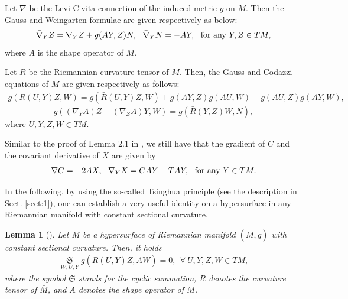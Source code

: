 \documentclass[reqno]{amsart}%
\newtheorem{lemma}[theorem]{Lemma}
\theoremstyle{definition}
\numberwithin{equation}{section}
\begin{document}
Let $\nabla$ be the Levi-Civita connection of the induced metric
$g$ on $M$. Then the Gauss and Weingarten
formulae are given respectively as below:
%
\begin{equation}\label{eqn:APX2.5}
	\bar{\nabla}_YZ=\nabla_YZ+g(AY,Z)N, ~~
	\bar{\nabla}_YN=-AY,~~\hbox{for any}~ Y,Z\in TM,
\end{equation}
%
where $A$ is the shape operator of $M$.

Let $R$ be the Riemannian curvature tensor of $M$. Then, the Gauss
and Codazzi equations of $M$ are given respectively as follows:
%
\begin{equation}\label{eqn:APX2.6}
	\begin{aligned}
		g(R(U,Y)Z,W)=g(\bar{R}(U,Y)Z,W)+g(AY,Z)g(AU,W)-g(AU,Z)g(AY,W),
	\end{aligned}
\end{equation}
%
\begin{equation}\label{eqn:APX2.7}
	g((\nabla_YA)Z-(\nabla_ZA)Y,W)=g(\bar{R}(Y,Z)W,N),
\end{equation}
%
where $U, Y, Z, W\in TM$.

Similar to the proof of Lemma 2.1 in \cite{GMY}, we still have that 
the gradient of $C$ and the covariant derivative of $X$ are given by 
%
\begin{equation}\label{eqn:APX2.9}
	\nabla C=-2AX,~~ \nabla_YX=CAY-TAY, ~~\hbox{for any}~ Y\in TM.
\end{equation}
%

In the following, by using the so-called Tsinghua principle (see the description in Sect. \ref{sect:1}), one can establish a very useful identity on a hypersurface in any Riemannian manifold with constant sectional curvature. 


\begin{lemma}[\cite{AD}]\label{thm:7.1}
	Let $M$ be a hypersurface of Riemannian manifold $(\bar{M},g)$ with constant sectional curvature. 
	Then, it holds
	\begin{equation}\label{eqn:4.1q1}
		\begin{aligned}
	\mathop\mathfrak{S}\limits_{W,U,Y}g(\bar{R}(U,Y)Z,AW)=0, \ \ \forall \ U,Y,Z,W\in TM, 
		\end{aligned}
	\end{equation}
	where the symbol $\mathfrak{S}$ stands for the cyclic summation, $\bar{R}$ denotes the curvature tensor of $\bar{M}$, 
	and $A$ denotes the shape operator of $M$.
\end{lemma}
\end{document}
